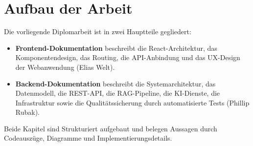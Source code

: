 \section{Aufbau der Arbeit}

Die vorliegende Diplomarbeit ist in zwei Hauptteile gegliedert:

\begin{itemize}
    \item \textbf{Frontend-Dokumentation} beschreibt die React-Architektur, das Komponentendesign, das Routing, die API-Anbindung und das UX-Design der Webanwendung (Elias Welt).
    \item \textbf{Backend-Dokumentation} beschreibt die Systemarchitektur, das Datenmodell, die REST-API, die RAG-Pipeline, die KI-Dienste, die Infrastruktur sowie die Qualitätssicherung durch automatisierte Tests (Phillip Rubak).
\end{itemize}

Beide Kapitel sind Strukturiert aufgebaut und belegen Aussagen durch Codeauszüge, Diagramme und Implementierungsdetails.